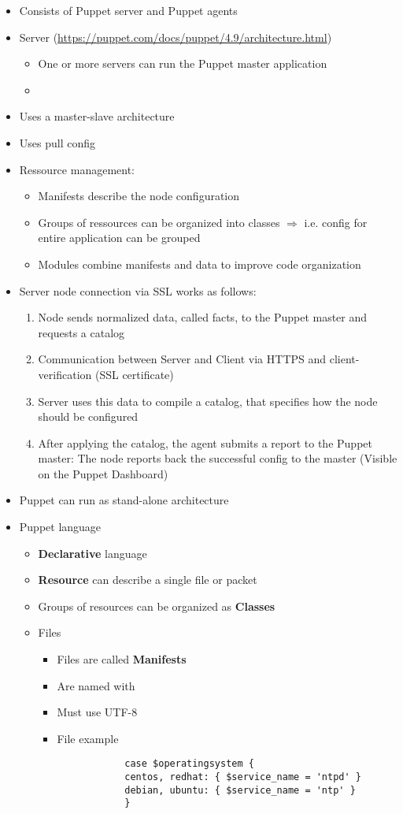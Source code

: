 \begin{itemize}
	\item Consists of Puppet server and Puppet agents
	\item Server (\url{https://puppet.com/docs/puppet/4.9/architecture.html})
	\begin{itemize}
		\item One or more servers can run the Puppet master application
		\item 
	\end{itemize}
	\item Uses a master-slave architecture
	\item Uses pull config
	\item Ressource management:
	\begin{itemize}
		\item Manifests describe the node configuration
		\item Groups of ressources can be organized into classes $\Rightarrow$ i.e. config for entire application can be grouped
		\item Modules combine manifests and data to improve code organization
	\end{itemize}
	\item Server node connection via SSL works as follows:
	\begin{enumerate}
		\item Node sends normalized data, called facts, to the Puppet master and requests a catalog
		\item Communication between Server and Client via HTTPS and client-verification (SSL certificate)
		\item Server uses this data to compile a catalog, that specifies how the node should be configured
		\item After applying the catalog, the agent submits a report to the Puppet master: The node reports back the successful config to the master (Visible on the Puppet Dashboard)
	\end{enumerate}
	\item Puppet can run as stand-alone architecture
	\item Puppet language
	\begin{itemize}
		\item \textbf{Declarative} language
		\item \textbf{Resource} can describe a single file or packet
		\item Groups of resources can be organized as \textbf{Classes}
		\item Files
		\begin{itemize}
			\item Files are called \textbf{Manifests}
			\item Are named with 
			\item Must use UTF-8
			\item File example\\
			\begin{verbatim}
			case $operatingsystem {
			centos, redhat: { $service_name = 'ntpd' }
			debian, ubuntu: { $service_name = 'ntp' }
			}
			

\end{verbatim}
\end{itemize}
\end{itemize}
\end{itemize}
